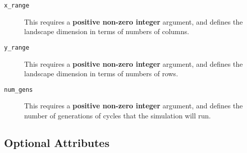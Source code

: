 \documentclass[11pt]{article}
\newcommand{\xmlattr}[1]{{\tt\textcolor{xmlattr}{#1}}}
\begin{document}
\begin{description}
	\item[\xmlattr{x\_range}] This requires a \textbf{positive non-zero integer} argument, and defines the landscape dimension in terms of numbers of columns.

	\item[\xmlattr{y\_range}] This requires a \textbf{positive non-zero integer} argument, and defines the landscape dimension in terms of numbers of rows.

	\item[\xmlattr{num\_gens}] This requires a \textbf{positive non-zero integer} argument, and defines the number of generations of cycles that the simulation will run.

\end{description}

\subsection{Optional Attributes}
\end{document}
